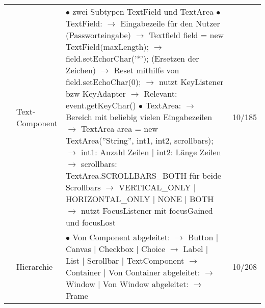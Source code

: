 \documentclass[11pt,a4paper]{article}
\begin{document}
\begin{center}
\begin{longtable}[h]{ | p{2.3cm} | p{2.3cm} | p{12.6cm} | p{1.2cm} | }
	& \makecell[l]{Text-\\Component} & \makecell[l]{$\bullet$ zwei Subtypen TextField und TextArea \\
	$\bullet$ TextField: \\
	\hspace{0.4cm} $\rightarrow$ Eingabezeile für den Nutzer (Passworteingabe) \\
	\hspace{0.4cm} $\rightarrow$ Textfield field = new TextField(maxLength); \\
	\hspace{0.4cm} $\rightarrow$ field.setEchorChar('*'); (Ersetzen der Zeichen) \\
	\hspace{0.4cm} $\rightarrow$ Reset mithilfe von field.setEchoChar(0); \\
	\hspace{0.4cm} $\rightarrow$ nutzt KeyListener bzw KeyAdapter \\
	\hspace{0.4cm} $\rightarrow$ Relevant: event.getKeyChar()\\
	$\bullet$ TextArea: \\
	\hspace{0.4cm} $\rightarrow$ Bereich mit beliebig vielen Eingabezeilen \\
	\hspace{0.4cm} $\rightarrow$ TextArea area = new TextArea(''String'', int1, int2, scrollbars); \\
	\hspace{0.4cm} $\rightarrow$ int1: Anzahl Zeilen | int2: Länge Zeilen \\
	\hspace{0.4cm} $\rightarrow$ scrollbars: TextArea.SCROLLBARS\_BOTH für beide Scrollbars \\
	\hspace{0.4cm} $\rightarrow$ VERTICAL\_ONLY | HORIZONTAL\_ONLY | NONE | BOTH \\
 	\hspace{0.4cm} $\rightarrow$ nutzt FocusListener mit focusGained und focusLost }  & 10/185 \\ \cline{2-4}
 	
 	& Hierarchie & \makecell[l]{$\bullet$ Von Component abgeleitet: \\
 	\hspace{0.4cm} $\rightarrow$ Button | Canvas | Checkbox | Choice \\
 	\hspace{0.4cm} $\rightarrow$ Label | List | Scrollbar | TextComponent \\
 	\hspace{0.4cm} $\rightarrow$ Container | Von Container abgeleitet: \\
 	\hspace{0.8cm} $\rightarrow$ Window | Von Window abgeleitet: \\
 	\hspace{1.2cm} $\rightarrow$ Frame }& 10/208 \\ \cline{2-4}
 	

\end{longtable}
\end{center}
\end{document}
